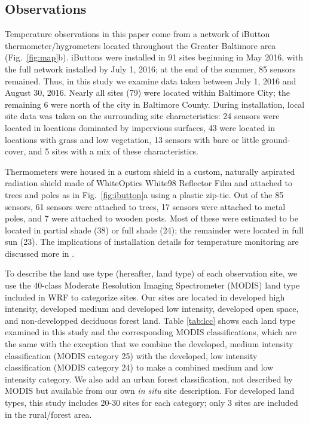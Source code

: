 \documentclass[draft,linenumbers]{agujournal}
\begin{document}
\subsection{Observations}
Temperature observations in this paper come from a network of iButton thermometer/hygrometers located throughout the Greater Baltimore area (Fig.~\ref{fig:map}b). 
iButtons were installed in 91 sites beginning in May 2016, with the full network installed by July 1, 2016; at the end of the summer, 85 sensors remained. Thus, in this study we examine data taken between July 1, 2016 and August 30, 2016. Nearly all sites (79) were located within Baltimore City; the remaining 6 were north of the city in Baltimore County. During installation, local site data was taken on the surrounding site characteristics: 24 sensors were located in locations dominated by impervious surfaces, 43 were located in locations with grass and low vegetation, 13 sensors with bare or little ground-cover, and 5 sites with a mix of these characteristics. 

Thermometers were housed in a custom shield in a custom, naturally aspirated radiation shield made of WhiteOptics White98 Reflector Film and attached to trees and poles as in Fig.~\ref{fig:ibutton}a using a plastic zip-tie. Out of the 85 sensors, 61 sensors were attached to trees, 17 sensors were attached to metal poles, and 7 were attached to wooden posts. Most of these were estimated to be located in partial shade (38) or full shade (24); the remainder were located in full sun (23). The implications of installation details for temperature monitoring are discussed more in \cite{scott2017intraurban}.

 To describe the land use type (hereafter, land type) of each observation site, we use the 40-class Moderate Resolution Imaging Spectrometer (MODIS) land type included in WRF to categorize sites. Our sites are located in developed high intensity, developed medium and developed low intensity, developed open space, and non-developped deciduous forest land.
 Table \ref{tab:lcc} shows each land type examined in this study and the corresponding MODIS classifications, which are the same with the exception that we combine the developed, medium intensity classification (MODIS category 25) with the developed, low intensity classification (MODIS category 24) to make a combined medium and low intensity category. We also add an urban forest classification, not described by MODIS but available from our own \textit{in situ} site description. 
For developed land types, this study includes 20-30 sites for each category; only 3 sites are included in the rural/forest area. 
\end{document}
